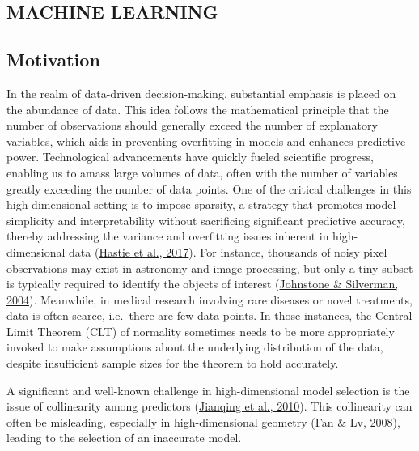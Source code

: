 \documentclass[
  11pt,
]{article}
\begin{document}
\hypertarget{machine-learning}{%
\subsection{MACHINE LEARNING}\label{machine-learning}}

\subsection{Motivation}

In the realm of data-driven decision-making, substantial emphasis is
placed on the abundance of data. This idea follows the mathematical
principle that the number of observations should generally exceed the
number of explanatory variables, which aids in preventing overfitting in
models and enhances predictive power. Technological advancements have
quickly fueled scientific progress, enabling us to amass large volumes
of data, often with the number of variables greatly exceeding the number
of data points. One of the critical challenges in this high-dimensional
setting is to impose sparsity, a strategy that promotes model simplicity
and interpretability without sacrificing significant predictive
accuracy, thereby addressing the variance and overfitting issues
inherent in high-dimensional data
(\protect\hyperlink{ref-Hastie2017}{Hastie et al., 2017}). For instance,
thousands of noisy pixel observations may exist in astronomy and image
processing, but only a tiny subset is typically required to identify the
objects of interest (\protect\hyperlink{ref-Johnstone2004}{Johnstone \&
Silverman, 2004}). Meanwhile, in medical research involving rare
diseases or novel treatments, data is often scarce, i.e.~there are few
data points. In those instances, the Central Limit Theorem (CLT) of
normality sometimes needs to be more appropriately invoked to make
assumptions about the underlying distribution of the data, despite
insufficient sample sizes for the theorem to hold accurately.

A significant and well-known challenge in high-dimensional model
selection is the issue of collinearity among predictors
(\protect\hyperlink{ref-Jianqing2010}{Jianqing et al., 2010}). This
collinearity can often be misleading, especially in high-dimensional
geometry (\protect\hyperlink{ref-Fan2008}{Fan \& Lv, 2008}), leading to
the selection of an inaccurate model.
\end{document}
